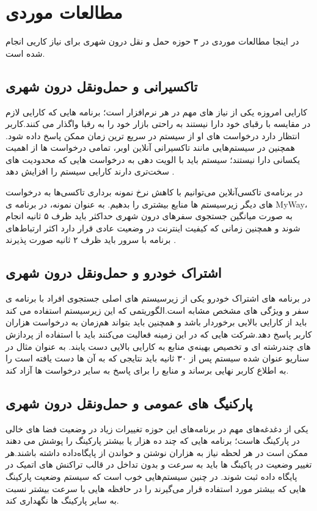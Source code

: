 \section{مطالعات موردی}

در اینجا مطالعات موردی در ۳ حوزه حمل و نقل درون شهری برای نیاز کاریی انجام شده است. 
\subsection{تاکسیرانی و حمل‌و‌نقل درون شهری}
کارایی امروزه یکی از نیاز های مهم در هر نرم‌افزار است؛ برنامه هایی که کارایی لازم در مقایسه با رقبای خود دارا نیستند به راحتی بازار خود را به رقبا واگذار می کنند.کاربر انتظار دارد درخواست های او از سیستم در سریع ترین زمان ممکن پاسخ داده شود.
همچنین در سیستم‌هایی مانند تاکسیرانی آنلاین اوبر، تمامی درخواست ها از اهمیت یکسانی دارا نیستند؛ سیستم باید با الویت دهی به درخواست هایی که محدودیت های سخت‌تری دارند کارایی سیستم را افزایش دهد \cite{uber_priority} .

در برنامه‌ی تاکسی‌آنلاین می‌توانیم با کاهش نرخ نمونه برداری تاکسی‌ها به درخواست های دیگر زیرسیستم ها منابع بیشتری را بدهیم.
به عنوان نمونه، در برنامه ی MyWay، به صورت میانگین جستجوی سفرهای درون شهری حداکثر باید ظرف ۵ ثانیه انجام شوند و همچنین زمانی که کیفیت اینترنت در وضعیت عادی قرار دارد اکثر ارتباط‌های برنامه با سرور باید ظرف ۲ ثانیه صورت پذیرند \cite{myway_req}.

\subsection{اشتراک خودرو و حمل‌و‌نقل درون شهری}
در برنامه های اشتراک خودرو یکی از زیرسیستم های اصلی جستجوی افراد با برنامه ی سفر و ویژگی های مشخص مشابه است.الگوریتمی که این زیرسیستم استفاده می کند باید از کارایی بالایی برخوردار باشد و همچنین باید بتواند هم‌زمان به درخواست هزاران کاربر پاسخ دهد.شرکت هایی که در این زمینه فعالیت می‌کنند باید با استفاده از پردازش های چندرشته ای و تخصیص بهینه‌ي منابع به کارایی بالایی دست یابند. به عنوان مثال در سناریو عنوان شده سیستم پس از ۳۰ ثانیه باید نتایجی که به آن ها دست یافته است را به اطلاع کاربر نهایی برساند و منابع را برای پاسخ به سایر درخواست ها آزاد کند.

\subsection{پارکنیگ های عمومی و حمل‌و‌نقل درون شهری}
یکی از دغدغه‌های مهم در برنامه‌های این حوزه تغییرات زیاد در وضعیت فضا های خالی در پارکینگ هاست؛ برنامه هایی که چند ده هزار یا بیشتر پارکینگ را پوشش می دهند ممکن است در هر لحظه نیاز به هزاران نوشتن و خواندن از پایگاه‌داده داشته باشند.هر تغییر وضعیت در پاکینگ ها باید به سرعت و بدون تداخل در قالب تراکنش های اتمیک در پایگاه داده ثبت شوند.
در چنین سیستم‌هایی خوب است که سیستم وضعیت پارکینگ هایی که بیشتر مورد استفاده قرار می‌گیرند را در حافظه هایی با سرعت بیشتر نسبت به سایر پارکینگ ها نگهداری کند.